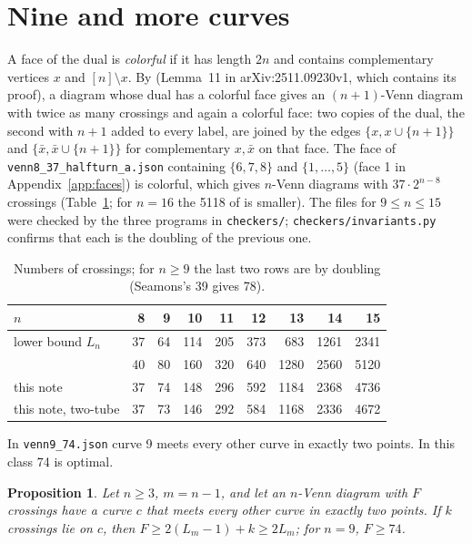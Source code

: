 \documentclass[11pt]{article}
\newtheorem{proposition}[theorem]{Proposition}
\theoremstyle{remark}
\begin{document}
\section{Nine and more curves}\label{sec:nine}

A face of the dual is \emph{colorful} if it has length $2n$ and contains complementary vertices $x$ and
$[n]\setminus x$. By \cite[Lemma~10]{BGMV} (Lemma~11 in arXiv:2511.09230v1, which contains its proof), a diagram whose
dual has a colorful face gives an $(n+1)$-Venn diagram with twice as many crossings and again a colorful face: two
copies of the dual, the second with $n+1$ added to every label, are joined by the edges $\{x,x\cup\{n+1\}\}$ and
$\{\bar x,\bar x\cup\{n+1\}\}$ for complementary $x,\bar x$ on that face. The face of
\texttt{venn8\_37\_halfturn\_a.json} containing $\{6,7,8\}$ and $\{1,\dots,5\}$ (face 1 in
Appendix~\ref{app:faces}) is colorful, which gives $n$-Venn diagrams with $37\cdot2^{n-8}$ crossings
(Table~\ref{tab:double}; for $n=16$ the 5118 of \cite{BGMV} is smaller). The files for $9\le n\le15$ were checked
by the three programs in \texttt{checkers/}; \texttt{checkers/invariants.py} confirms that each is the doubling of
the previous one.

\begin{table}[h]
\centering\small
\begin{tabular}{lrrrrrrrr}
\toprule
$n$ & 8 & 9 & 10 & 11 & 12 & 13 & 14 & 15\\
\midrule
lower bound $L_n$ \cite{BR98} & 37 & 64 & 114 & 205 & 373 & 683 & 1261 & 2341\\
\cite[Theorem~2]{BGMV} & 40 & 80 & 160 & 320 & 640 & 1280 & 2560 & 5120\\
this note & 37 & 74 & 148 & 296 & 592 & 1184 & 2368 & 4736\\
this note, two-tube & 37 & 73 & 146 & 292 & 584 & 1168 & 2336 & 4672\\
\bottomrule
\end{tabular}
\caption{Numbers of crossings; for $n\ge9$ the last two rows are by doubling (Seamons's 39 gives 78).}
\label{tab:double}
\end{table}

In \texttt{venn9\_74.json} curve 9 meets every other curve in exactly two points. In this class 74 is optimal.

\begin{proposition}\label{prop:class}
Let $n\ge3$, $m=n-1$, and let an $n$-Venn diagram with $F$ crossings have a curve $c$ that meets every other curve in
exactly two points. If $k$ crossings lie on $c$, then $F\ge2(L_m-1)+k\ge2L_m$; for $n=9$, $F\ge74$.
\end{proposition}
\end{document}
